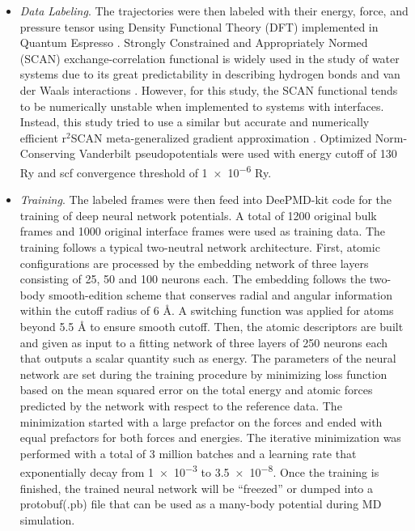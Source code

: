 \begin{itemize}
    \item \emph{Data Labeling}.
          The trajectories were then labeled with their energy, force, and
          pressure
          tensor using Density Functional Theory (DFT) implemented in Quantum
          Espresso
          \cite{QE-2009,QE-2017,QE-2020}. Strongly Constrained and
          Appropriately
          Normed
          (SCAN) exchange-correlation functional is widely used in the study of
          water
          systems due to its great predictability in describing hydrogen bonds
          and
          van
          der Waals interactions \cite{sun2015strongly, chen2017ab}. However,
          for
          this
          study, the SCAN functional tends to be numerically unstable when
          implemented
          to systems with interfaces. Instead, this study tried to use a
          similar but accurate
          and
          numerically efficient r$^2$SCAN meta-generalized gradient
          approximation
          \cite{Furness2020}. Optimized Norm-Conserving Vanderbilt
          pseudopotentials
          \cite{hamann2013optimized} were used with energy cutoff of 130 Ry and
          scf
          convergence threshold of \num{1e-6} Ry.

    \item \emph{Training}. The labeled frames were then feed into DeePMD-kit
          code
          \cite{wang2018deepmd,zeng2023deepmd,lu2021,zhang2018end} for the
          training
          of
          deep neural network potentials. A total of 1200 original bulk frames
          and 1000 original
          interface
          frames were used as training data. The training follows a typical
          two-neutral
          network architecture. First, atomic configurations are processed by
          the
          embedding network of three layers consisting of 25, 50 and 100
          neurons
          each.
          The embedding follows the two-body smooth-edition scheme
          \cite{zhang2018end}
          that conserves radial and angular information within the cutoff
          radius of 6
          \r{A}. A switching function was applied for atoms beyond 5.5 \r{A} to
          ensure
          smooth cutoff.	Then, the atomic descriptors are built and
          given as
          input to a
          fitting network of three layers of 250 neurons each that outputs a
          scalar
          quantity such as energy. The parameters of the neural network are
          set
          during
          the training procedure by minimizing	loss function based on the mean
          squared
          error on the total energy and atomic forces predicted
          by the network with respect to the reference data. The minimization
          started with a large prefactor on the forces and ended with equal
          prefactors
          for both forces and energies.    The iterative
          minimization
          was performed with a total of 3 million batches and a learning rate
          that
          exponentially decay from \num{1e-3} to \num{3.5e-8}. Once the
          training is finished, the trained neural network will be  ``freezed''
          or dumped into a protobuf(.pb) file that can be used as a many-body
          potential during MD simulation.


\end{itemize}

